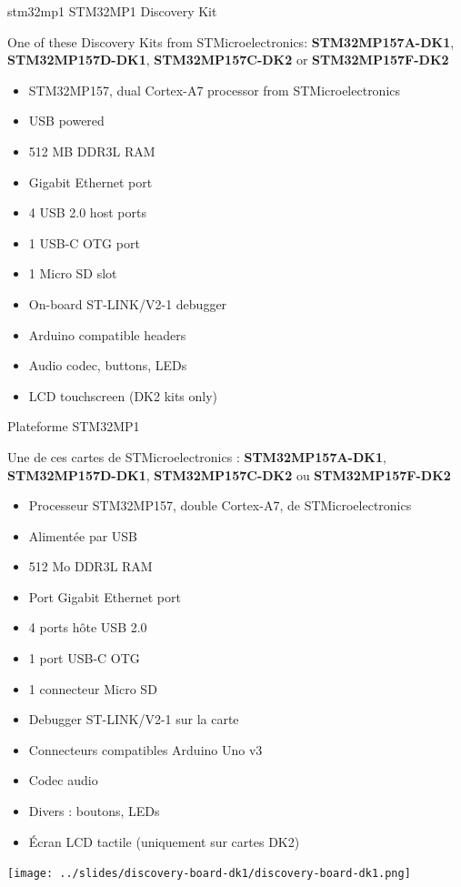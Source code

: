 {stm32mp1}
{STM32MP1 Discovery Kit}
{
  One of these Discovery Kits from STMicroelectronics: {\bf
  STM32MP157A-DK1}, {\bf STM32MP157D-DK1}, {\bf STM32MP157C-DK2} or
  {\bf STM32MP157F-DK2}
  \begin{itemize}
  \item STM32MP157, dual Cortex-A7 processor from STMicroelectronics
  \item USB powered
  \item 512 MB DDR3L RAM
  \item Gigabit Ethernet port
  \item 4 USB 2.0 host ports
  \item 1 USB-C OTG port
  \item 1 Micro SD slot
  \item On-board ST-LINK/V2-1 debugger
  \item Arduino compatible headers
  \item Audio codec, buttons, LEDs
  \item LCD touchscreen (DK2 kits only)
  \vspace{-0.7cm}
  \end{itemize}
}
{Plateforme STM32MP1}
{
  Une de ces cartes de STMicroelectronics : {\bf
  STM32MP157A-DK1}, {\bf STM32MP157D-DK1}, {\bf STM32MP157C-DK2} ou
  {\bf STM32MP157F-DK2}
  \begin{itemize}
  \item Processeur STM32MP157, double Cortex-A7, de STMicroelectronics
  \item Alimentée par USB
  \item 512 Mo DDR3L RAM
  \item Port Gigabit Ethernet port
  \item 4 ports hôte USB 2.0
  \item 1 port USB-C OTG
  \item 1 connecteur Micro SD
  \item Debugger ST-LINK/V2-1 sur la carte
  \item Connecteurs compatibles Arduino Uno v3
  \item Codec audio
  \item Divers : boutons, LEDs
  \item Écran LCD tactile (uniquement sur cartes DK2)
  \vspace{-0.7cm}
  \end{itemize}
}
{
  \begin{center}
    \texttt{[image: ../slides/discovery-board-dk1/discovery-board-dk1.png]}
  \end{center}
}

